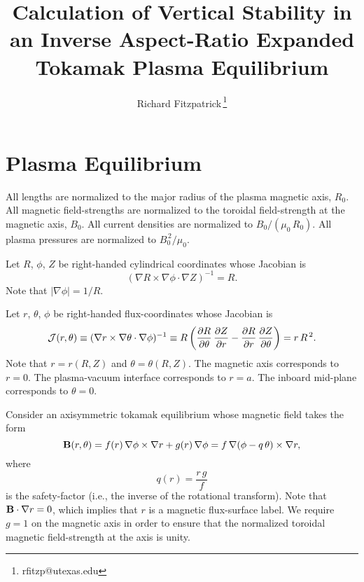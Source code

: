 \documentclass[12pt,prb,aps,notitlepage]{revtex4-1}
\begin{document}
\title{Calculation of Vertical Stability in an Inverse Aspect-Ratio Expanded Tokamak Plasma Equilibrium}
\author{Richard Fitzpatrick\,\footnote{rfitzp@utexas.edu}}
\maketitle

\section{Plasma Equilibrium}\label{geq}
All lengths  are normalized to  the major radius of the plasma magnetic axis, $R_0$. All magnetic field-strengths
are normalized to the  toroidal field-strength at the magnetic axis, $B_0$. All current densities are normalized to $B_0/(\mu_0\,R_0)$.  All plasma pressures are normalized to $B_0^{\,2}/\mu_0$.

Let $R$, $\phi$, $Z$ be right-handed cylindrical coordinates whose Jacobian 
is
\begin{equation}
(\nabla R\times \nabla\phi\cdot\nabla Z)^{-1} = R.
\end{equation}
Note that $|\nabla\phi|=1/R$. 

Let $r$, $\theta$, $\phi$ be right-handed flux-coordinates whose
Jacobian is
\begin{equation}\label{jac}
{\cal J}(r,\theta)\equiv (\nabla r\times \nabla\theta\cdot\nabla\phi)^{-1} \equiv R\left(\frac{\partial R}{\partial\theta}\,\frac{\partial Z}{\partial r} -\frac{\partial R}{\partial r}\,\frac{\partial Z}{\partial \theta}\right)= r\,R^{\,2}.
\end{equation}
Note that $r=r(R,Z)$ and $\theta=\theta(R,Z)$. 
The magnetic axis corresponds to $r=0$. The plasma-vacuum interface corresponds to $r=a$. The inboard mid-plane corresponds to $\theta=0$. 

Consider an axisymmetric tokamak equilibrium whose magnetic field takes the form
\begin{equation}
{\bf B}(r,\theta) = f(r)\,\nabla\phi\times \nabla r + g(r)\,\nabla\phi = f\,\nabla(\phi-q\,\theta)\times \nabla r,
\end{equation}
where
\begin{equation}\label{q}
q(r) = \frac{r\,g}{f}
\end{equation}
is the safety-factor (i.e., the inverse of the rotational transform). Note that ${\bf B}\cdot\nabla r=0$, which implies that $r$ is a magnetic flux-surface label.
We require $g=1$ on the magnetic axis in order to ensure that the normalized toroidal magnetic field-strength at the  axis is unity.  
\end{document}
